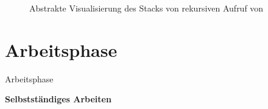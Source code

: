 \documentclass{../tuda-beamer}
\begin{document}
  \begin{frame}[c]
    \begin{figure}[h]
      \centering
      \caption{Abstrakte Visualisierung des Stacks von rekursiven Aufruf von }
    \end{figure}
  \end{frame}


  \section{Arbeitsphase}
  \begin{frame}[c]{Arbeitsphase}
    \begin{center}
      \textbf{\LARGE Selbstständiges Arbeiten}
    \end{center}
  \end{frame}
\end{document}
